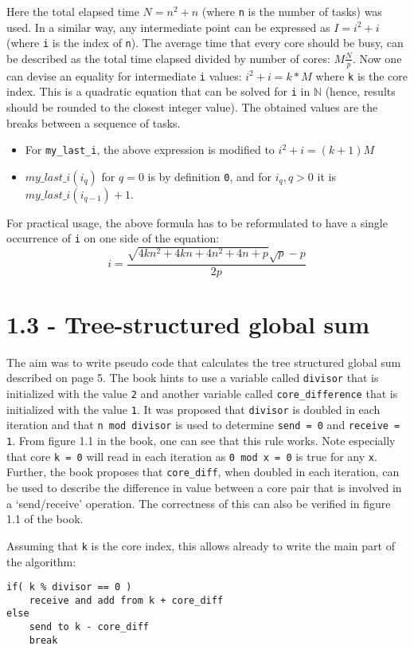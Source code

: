 \documentclass[a4paper,11pt,twoside]{article}
\begin{document}
Here the total elapsed time $N = n^{2} + n$ (where \verb+n+ is the number of tasks) was used. In a similar way, any intermediate point can be expressed as $I = i^{2} + i$ (where \verb+i+ is the index of \verb+n+). The average time that every core should be busy, can be described as the total time elapsed divided by number of cores: $M\frac{N}{p}$. Now one can devise an equality for intermediate \verb+i+ values: $i^{2}+i = k*M$ where \verb+k+ is the core index. This is a quadratic equation that can be solved for \verb+i+ in $\mathbb{N}$ (hence, results should be rounded to the closest integer value). The obtained values are the breaks between a sequence of tasks. 
\begin{itemize}
\item For \verb+my_last_i+, the above expression is modified to  $i^{2}+i=(k + 1)M$
\item $my\_last\_i(i_{q})$ for $q=0$ is by definition \verb+0+, and for $i_{q}, q > 0$ it is $my\_last\_i(i_{q-1}) + 1$. 
\end{itemize}
 
For practical usage, the above formula has to be reformulated to have a single occurrence of \verb+i+ on one side of the equation:
\begin{equation*}
i=\frac{\sqrt{4kn^{2}+4kn+4n^{2}+4n+p}\sqrt{p}-p}{2p}
\end{equation*}

\section{1.3 - Tree-structured global sum}
The aim was to write pseudo code that calculates the tree structured global sum described on page 5. The book hints to use a variable called \verb+divisor+ that is initialized with the value \verb+2+ and another variable called \verb+core_difference+ that is initialized with the value \verb+1+. It was proposed that \verb+divisor+ is doubled in each iteration and that \verb+n mod divisor+ is used to determine \verb+send = 0+ and \verb+receive = 1+. From figure 1.1 in the book, one can see that this rule works. Note especially that core \verb+k = 0+ will read in each iteration as \verb+0 mod x = 0+ is true for any \verb+x+. Further, the book proposes that \verb+core_diff+, when doubled in each iteration, can be used to describe the difference in value between a core pair that is involved in a `send/receive' operation. The correctness of this can also be verified in figure 1.1 of the book.

Assuming that \verb+k+ is the core index, this allows already to write the main part of the algorithm:
\begin{verbatim}
if( k % divisor == 0 )
    receive and add from k + core_diff
else
    send to k - core_diff
    break
\end{verbatim}
\end{document}
